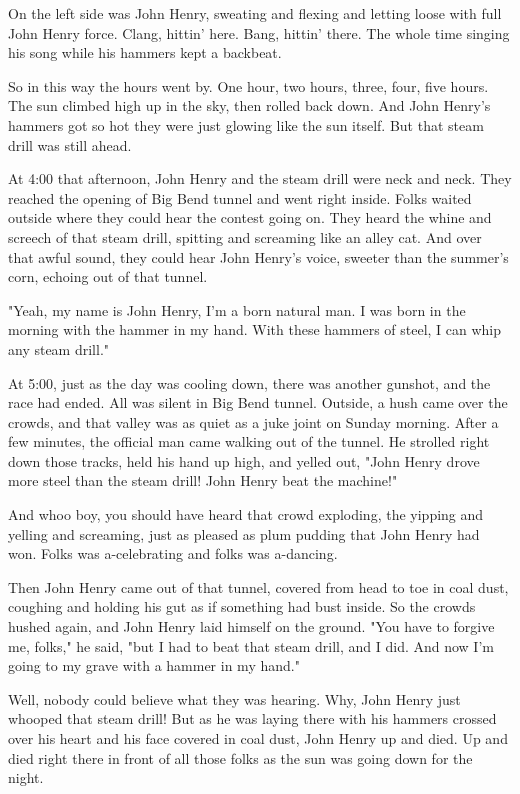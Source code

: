 On the left side was John Henry, sweating and flexing and letting loose with full John Henry force. Clang, hittin' here. Bang, hittin' there. The whole time singing his song while his hammers kept a backbeat.

So in this way the hours went by. One hour, two hours, three, four, five hours. The sun climbed high up in the sky, then rolled back down. And John Henry's hammers got so hot they were just glowing like the sun itself. But that steam drill was still ahead.

At 4:00 that afternoon, John Henry and the steam drill were neck and neck. They reached the opening of Big Bend tunnel and went right inside. Folks waited outside where they could hear the contest going on. They heard the whine and screech of that steam drill, spitting and screaming like an alley cat. And over that awful sound, they could hear John Henry's voice, sweeter than the summer's corn, echoing out of that tunnel.

"Yeah, my name is John Henry, I'm a born natural man. I was born in the morning with the hammer in my hand. With these hammers of steel, I can whip any steam drill."

At 5:00, just as the day was cooling down, there was another gunshot, and the race had ended. All was silent in Big Bend tunnel. Outside, a hush came over the crowds, and that valley was as quiet as a juke joint on Sunday morning. After a few minutes, the official man came walking out of the tunnel. He strolled right down those tracks, held his hand up high, and yelled out, "John Henry drove more steel than the steam drill! John Henry beat the machine!"

And whoo boy, you should have heard that crowd exploding, the yipping and yelling and screaming, just as pleased as plum pudding that John Henry had won. Folks was a-celebrating and folks was a-dancing.

Then John Henry came out of that tunnel, covered from head to toe in coal dust, coughing and holding his gut as if something had bust inside. So the crowds hushed again, and John Henry laid himself on the ground. "You have to forgive me, folks," he said, "but I had to beat that steam drill, and I did. And now I'm going to my grave with a hammer in my hand."

Well, nobody could believe what they was hearing. Why, John Henry just whooped that steam drill! But as he was laying there with his hammers crossed over his heart and his face covered in coal dust, John Henry up and died. Up and died right there in front of all those folks as the sun was going down for the night.

